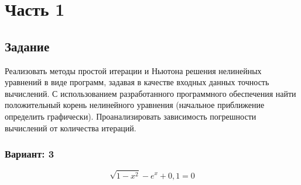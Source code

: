 
\chapter*{Часть 1}

\section*{Задание}
Реализовать методы простой итерации и Ньютона решения нелинейных уравнений в виде
программ, задавая в качестве входных данных точность вычислений. С использованием
разработанного программного обеспечения найти положительный корень нелинейного
уравнения (начальное приближение определить графически). Проанализировать зависимость
погрешности вычислений от количества итераций.

\subsection*{Вариант: 3}


$$\sqrt{1 - x^2} - e^x + 0{,}1 = 0$$

\pagebreak